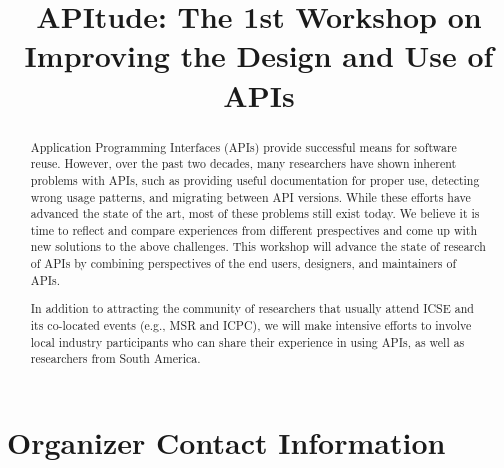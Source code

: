 \documentclass[10pt, conference]{IEEEtran}
\begin{document}
\title{APItude: The 1st Workshop on Improving the Design and Use of APIs}


\newcommand\tud[0]{\textsuperscript{\normalfont \textdagger}}
\newcommand\iowa[0]{\textsuperscript{\normalfont \textparagraph}}
\newcommand\utd[0]{\textsuperscript{\normalfont \ddag}}
\newcommand\lanu[0]{\textsuperscript{\normalfont \textsection}}
\newcommand\ualberta[0]{\textsuperscript{\normalfont \textasteriskcentered}}

\author{
\and
{}
\and
{}
\and
{}
}


\maketitle


\begin{abstract}
Application Programming Interfaces (APIs) provide successful means for software reuse. However, over the past two decades, many researchers have shown inherent problems with APIs, such as providing useful documentation for proper use, detecting wrong usage patterns, and migrating between API versions. While these efforts have advanced the state of the art, most of these problems still exist today. We believe it is time to reflect and compare experiences from different prespectives and come up with new solutions to the above challenges. This workshop will advance the state of research of APIs by combining perspectives of the end users, designers, and maintainers of APIs.

In addition to attracting the community of researchers that usually attend ICSE and its co-located events (e.g., MSR and ICPC), we will make intensive efforts to involve local industry participants who can share their experience in using APIs, as well as researchers from South America.
\end{abstract}

\section{Organizer Contact Information}
\end{document}
